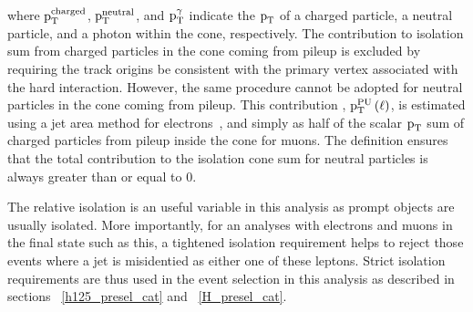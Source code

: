 where $\text{p}_\text{T}^\text{charged}$, $\text{p}_\text{T}^\text{neutral}$, and $\text{p}_\text{T}^{\gamma}$  indicate the $\text{p}_\text{T}$ of a charged particle, a neutral particle, and a photon within the cone, respectively. The contribution to isolation sum from charged particles in the cone coming from pileup is excluded by requiring the track origins be consistent with the primary vertex associated with the hard interaction. However, the same procedure cannot be adopted for neutral particles in the cone coming from pileup. This contribution , $\text{p}_\text{T}^\text{PU}\left(\ell\right)$, is estimated using a jet area method for electrons~\cite{isolation_1,isolation_2}, and simply as half of the scalar $\text{p}_\text{T}$ sum of charged particles from pileup inside the cone for muons. The definition ensures that the total contribution to the isolation cone sum for neutral particles is always greater than or equal to 0. 

The relative isolation is an useful variable in this analysis as prompt objects are usually isolated. More importantly, for an analyses with electrons and muons in the final state such as this, a tightened isolation requirement helps to reject those events where a jet is misidentied as either one of these leptons. Strict isolation requirements are thus used in the event selection in this analysis as described in sections ~\ref{h125_presel_cat} and ~\ref{H_presel_cat}.    





